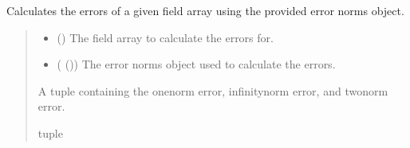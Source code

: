 \documentclass[a4paper,11pt,english,openany]{sphinxmanual}
\begin{document}
\begin{fulllineitems}
\begin{fulllineitems}
\begin{quote}
\begin{description}
\begin{itemize}
\end{itemize}

\end{description}\end{quote}

\end{fulllineitems}


\begin{fulllineitems}
\label{\detokenize{api/spyice.postprocess.analysis:spyice.postprocess.analysis.Analysis.calculate_errors}}
\pysigstartsignatures
{}
\pysigstopsignatures
\sphinxAtStartPar
Calculates the errors of a given field array using the provided error norms object.
\begin{quote}\begin{description}
\begin{itemize}
\item {} 
\sphinxAtStartPar
{} () \textendash{} The field array to calculate the errors for.

\item {} 
\sphinxAtStartPar
{} ({\hyperref[\detokenize{api/spyice.utils.error_norms:spyice.utils.error_norms.ErrorNorms}]{}} ()) \textendash{} The error norms object used to calculate the errors.

\end{itemize}

\sphinxAtStartPar
A tuple containing the one\sphinxhyphen{}norm error, infinity\sphinxhyphen{}norm error, and two\sphinxhyphen{}norm error.

\sphinxAtStartPar
tuple

\end{description}\end{quote}

\end{fulllineitems}


\end{fulllineitems}
\end{document}
